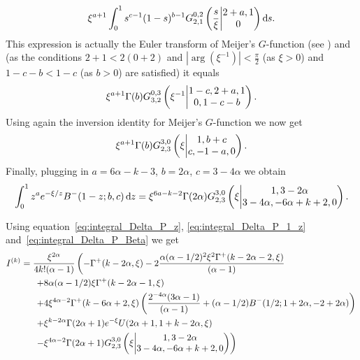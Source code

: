 \begin{align*}
	\xi^{a+1} \int_0^1 s^{c-1} (1-s)^{b-1} \MeijerGnew{0}{2}{2}{1}{2+a,1}{0}{\frac{s}{\xi}} \dd s.
\end{align*}
This expression is actually the Euler transform of Meijer's $G$-function (see \cite[p. 214, 5.5.2.(5)]{erdelyi1953higher}) and (as the conditions $2+1<2(0+2)$ and $|\arg(\xi^{-1})| < \frac{\pi}{2}$ (as $\xi>0$) and $1-c-b<1-c$ (as $b>0$)  are satisfied) it equals
\begin{align*}
	\xi^{a+1} \Gamma(b) \MeijerGnew{0}{3}{3}{2}{1-c,2+a,1}{0,1-c-b}{\xi^{-1}}.
\end{align*}
Using again the inversion identity for Meijer's $G$-function we now get
\begin{align*}
	\xi^{a+1} \Gamma(b) \MeijerGnew{3}{0}{2}{3}{1,b+c}{c,-1-a,0}{\xi}.
\end{align*}
Finally, plugging in $a= 6\alpha-k-3$, $b=2\alpha$, $c=3-4\alpha$ we obtain
\begin{equation}\label{eq:integral_Delta_P_Beta}
	\int_0^1 z^a e^{-\xi/z} B^-(1-z;b,c) \dd z =
	\xi^{6a-k-2} \Gamma(2\alpha) \MeijerGnew{3}{0}{2}{3}{1,3-2\alpha}{3-4\alpha,-6\alpha+k+2,0}{\xi}.
\end{equation}


Using equation~\eqref{eq:integral_Delta_P_z}, \eqref{eq:integral_Delta_P_1_z} and~\eqref{eq:integral_Delta_P_Beta} we get
\begin{align*}
	I^{(k)}
	&=\frac{\xi^{2\alpha}}{4k!(\alpha-1)} \left( -\Gamma^+(k - 2 \alpha, \xi) 
		- 2\frac{\alpha (\alpha - 1/2)^2 \xi^{2} \Gamma^+(k - 2 \alpha - 2, \xi)}{(\alpha - 1)} \right. \\ 
	&\hspace{15pt}\left.+ 8 \alpha (\alpha - 1/2) \xi \Gamma^+(k - 2 \alpha - 1,\xi) \right.\\ 
	&\hspace{15pt}\left.+ 4\xi^{4\alpha - 2} 
		\Gamma^+(k - 6 \alpha + 2, \xi) \left( 
		\frac{2^{ - 4\alpha}(3 \alpha - 1)}{(\alpha - 1)} + (\alpha - 1/2) B^-(1/2; 1 + 2 \alpha, -2 + 2 \alpha) \right)  \right.\\ 
	&\hspace{15pt}\left.+ \xi^{k-2\alpha} \Gamma(2\alpha+1)e^{-\xi} 	
		U(2\alpha+1,1+k-2\alpha,\xi) \right. \\ 
	&\hspace{15pt}\left.- \xi^{4\alpha-2} 
		\Gamma(2\alpha+1)\MeijerGnew{3}{0}{2}{3}{1,3-2\alpha}{3-4\alpha,-6\alpha+k+2,0}{\xi}  \right)\\
\end{align*}%

